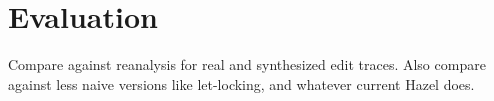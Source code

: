 
\section{Evaluation}%
\label{sec:Evaluation}

Compare against reanalysis for real and synthesized edit traces. Also compare against less naive versions like let-locking, and whatever current Hazel does. 